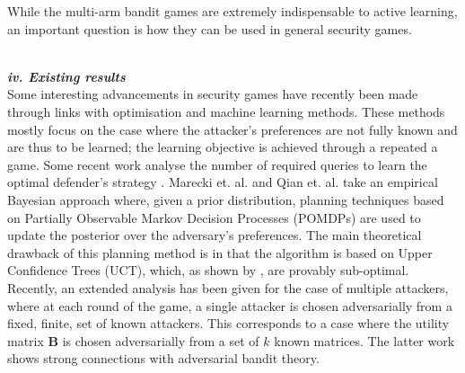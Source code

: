 While the multi-arm bandit games are extremely indispensable to active learning, an important question is how they can be used in general security games.


\noindent \textbf{\textit{\\iv. Existing results}}\\
Some interesting advancements in security games have recently been  made through links with optimisation and machine learning methods. 
These methods mostly focus on the case where the attacker's preferences are not fully known and are thus to be learned; the learning objective is achieved through a repeated a game. Some recent work analyse the number of required queries to learn the optimal defender's strategy \cite{blum2014learning, letchford2009learning}. 
Marecki et. al. and Qian et. al.\cite{Marecki12PR, qian2014online} take an empirical Bayesian approach where, given a prior distribution, planning techniques based on Partially Observable Markov Decision Processes (POMDPs) are used to update the posterior over the adversary's preferences.
The main theoretical drawback of this planning method is in that the algorithm is based on Upper Confidence Trees (UCT), which, as shown by  \cite{munos2014bandits}, are provably sub-optimal. 
Recently, an extended analysis has been given\cite{Balcan15CR} for the case of multiple attackers, where at each round of the game, a single attacker is chosen adversarially from a fixed, finite, set of known attackers. This corresponds to a case where the utility matrix $\boldsymbol B$ is chosen adversarially from a set of $k$ known matrices.  The latter work shows strong connections with adversarial bandit theory. 

